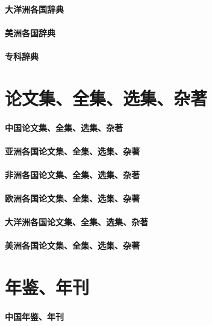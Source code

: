 \documentclass[UTF8]{../ApplicationUniverse}
\begin{document}
\subsubsection{大洋洲各国辞典}
\subsubsection{美洲各国辞典}
\subsubsection{专科辞典}






\chapter{论文集、全集、选集、杂著}
\subsubsection{中国论文集、全集、选集、杂著}
\subsubsection{亚洲各国论文集、全集、选集、杂著}
\subsubsection{非洲各国论文集、全集、选集、杂著}
\subsubsection{欧洲各国论文集、全集、选集、杂著}
\subsubsection{大洋洲各国论文集、全集、选集、杂著}
\subsubsection{美洲各国论文集、全集、选集、杂著}







\chapter{年鉴、年刊}
\subsubsection{中国年鉴、年刊}
\end{document}
